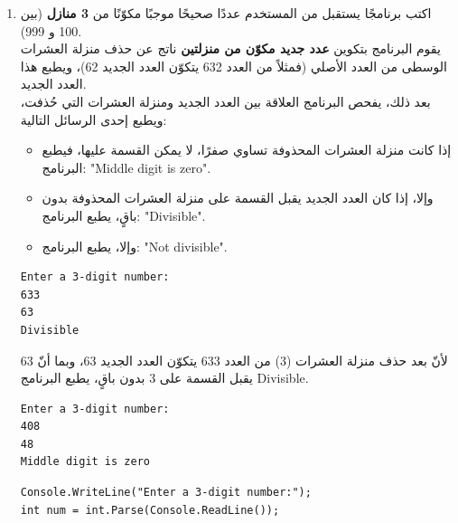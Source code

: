 \documentclass[14pt]{extarticle}
\begin{document}
\begin{enumerate}[resume, itemsep=2.2em]

\item
اكتب برنامجًا يستقبل من المستخدم عددًا صحيحًا موجبًا مكوّنًا من \textbf{3 منازل} (بين 100 و 999). \\
يقوم البرنامج بتكوين \textbf{عدد جديد مكوّن من منزلتين} ناتج عن حذف منزلة العشرات الوسطى من العدد الأصلي (فمثلاً من العدد \textenglish{632} يتكوّن العدد الجديد \textenglish{62})، ويطبع هذا العدد الجديد. \\
بعد ذلك، يفحص البرنامج العلاقة بين العدد الجديد ومنزلة العشرات التي حُذفت، ويطبع إحدى الرسائل التالية:
\begin{itemize}[nosep]
    \item إذا كانت منزلة العشرات المحذوفة تساوي صفرًا، لا يمكن القسمة عليها، فيطبع البرنامج: \textenglish{"Middle digit is zero"}.
    \item وإلا، إذا كان العدد الجديد يقبل القسمة على منزلة العشرات المحذوفة بدون باقٍ، يطبع البرنامج: \textenglish{"Divisible"}.
    \item وإلا، يطبع البرنامج: \textenglish{"Not divisible"}.
\end{itemize}

\ifdetailed
\begin{boxExample}[1]
\begin{english}
\begin{verbatim}
Enter a 3-digit number:
633
63
Divisible
\end{verbatim}
\end{english}
\end{boxExample}
لأنّ بعد حذف منزلة العشرات ($3$) من العدد $633$ يتكوّن العدد الجديد $63$، وبما أنّ $63$ يقبل القسمة على $3$ بدون باقٍ، يطبع البرنامج \textenglish{Divisible}.
\begin{boxExample}[2]
\begin{english}
\begin{verbatim}
Enter a 3-digit number:
408
48
Middle digit is zero
\end{verbatim}
\end{english}
\end{boxExample}
\fi

\ifwithsols
\begin{boxSolution}
\begin{english}
\begin{verbatim}
Console.WriteLine("Enter a 3-digit number:");
int num = int.Parse(Console.ReadLine());


\end{verbatim}
\end{english}
\end{boxSolution}
\end{enumerate}
\end{document}
